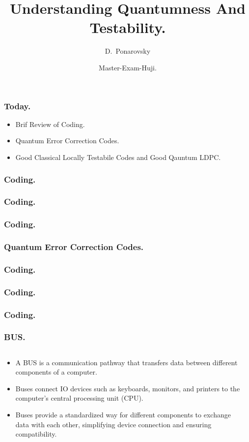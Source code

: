 \documentclass[usenames, aspectratio=169]{beamer}
\title[Understanding Quantumness And Testability.] %
{Understanding Quantumness And Testability.}
\subtitle{  }
\author[D.~Ponarovsky] %
	{D.~Ponarovsky\inst{1}}
\institute[HUJI] %
{  Faculty of Computer Science\newline
  Hebrew University of Jerusalem
}
\date[2023] %
{Master-Exam-Huji.}
\newcommand{\pslsq}[4]{
\begin{frame}
    \frametitle{#1} 
    \texttt{[image: \#3]}
    #4  
  \end{frame}
}
\newcommand{\psls}[4]{
  \begin{frame}
    \frametitle{#1} 
    \begin{columns}[t]
      \begin{column}{.48\textwidth}
        #4
      \end{column}
      \begin{column}{.52\textwidth}
        \adjincludegraphics[width=.98\linewidth, valign=t]{#3}
      \end{column} 
    \end{columns}
  \end{frame}
}
\begin{document}

\begin{frame}
  \maketitle
\end{frame}

\begin{frame}
  \frametitle{ Today. }
  \begin{itemize}
    \item<1-> Brif Review of Coding. 
    \item<2-> Quantum Error Correction Codes.
    \item<3->Good Classical Locally Testabile Codes and Good Qauntum LDPC.
  \end{itemize} 
\end{frame}

\begin{frame}
  \frametitle{ Coding. }
  \begin{center}
\end{center}
\end{frame}

\begin{frame}
  \frametitle{ Coding. }
\end{frame} 

\begin{frame}
  \frametitle{ Coding. }
\end{frame} 

\begin{frame}
  \frametitle{ Quantum Error Correction Codes. }
\end{frame} 

\begin{frame}
  \frametitle{ Coding. }
\end{frame} 

\begin{frame}
  \frametitle{ Coding. }
\end{frame} 

\begin{frame}
  \frametitle{ Coding. }
\end{frame} 


\psls{BUS.}{0.3}{./Peterson-out.png}{ 
  \begin{itemize}[<+->]
    \item  A BUS is a communication pathway that transfers data between different components of a computer.
    \item  Buses connect IO devices such as keyboards, monitors, and printers to the computer's central processing unit (CPU).
    \item  Buses provide a standardized way for different components to exchange data with each other, simplifying device connection and ensuring compatibility.
\end{itemize}
}
\end{document}
